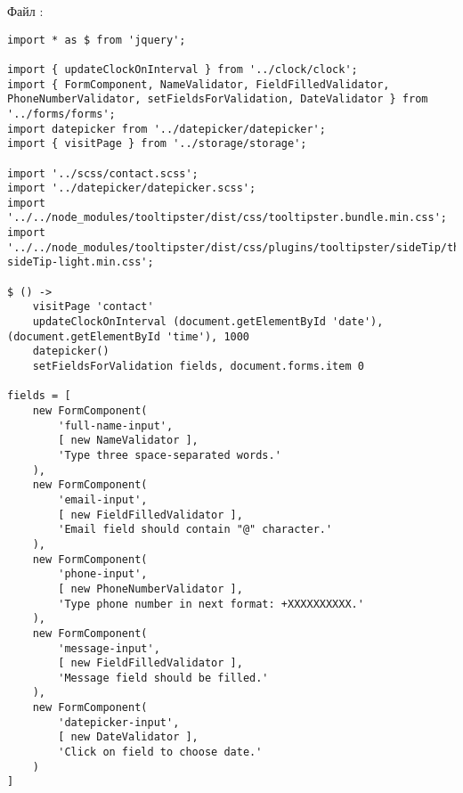 \documentclass[a4paper,14pt]{extarticle}
\begin{document}
Файл :
\begin{lstlisting}
import * as $ from 'jquery';

import { updateClockOnInterval } from '../clock/clock';
import { FormComponent, NameValidator, FieldFilledValidator, PhoneNumberValidator, setFieldsForValidation, DateValidator } from '../forms/forms';
import datepicker from '../datepicker/datepicker';
import { visitPage } from '../storage/storage';

import '../scss/contact.scss';
import '../datepicker/datepicker.scss';
import '../../node_modules/tooltipster/dist/css/tooltipster.bundle.min.css';
import '../../node_modules/tooltipster/dist/css/plugins/tooltipster/sideTip/themes/tooltipster-sideTip-light.min.css';

$ () ->
    visitPage 'contact'
    updateClockOnInterval (document.getElementById 'date'), (document.getElementById 'time'), 1000
    datepicker()
    setFieldsForValidation fields, document.forms.item 0

fields = [
    new FormComponent(
        'full-name-input',
        [ new NameValidator ],
        'Type three space-separated words.'
    ),
    new FormComponent(
        'email-input',
        [ new FieldFilledValidator ],
        'Email field should contain "@" character.'
    ),
    new FormComponent(
        'phone-input',
        [ new PhoneNumberValidator ],
        'Type phone number in next format: +XXXXXXXXXX.'
    ),
    new FormComponent(
        'message-input',
        [ new FieldFilledValidator ],
        'Message field should be filled.'
    ),
    new FormComponent(
        'datepicker-input',
        [ new DateValidator ],
        'Click on field to choose date.'
    )
]
\end{lstlisting}
\end{document}
